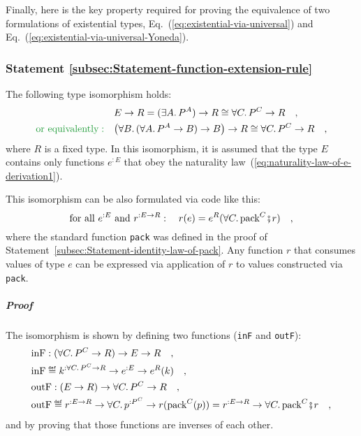 Finally, here is the key property required for proving the equivalence
of two formulations of existential types, Eq.~(\ref{eq:existential-via-universal})
and Eq.~(\ref{eq:existential-via-universal-Yoneda}).

\subsubsection{Statement \label{subsec:Statement-function-extension-rule}\ref{subsec:Statement-function-extension-rule}}

The following type isomorphism holds:
\begin{align*}
 & E\rightarrow R=(\exists A.\,P^{A})\rightarrow R\cong\forall C.\,P^{C}\rightarrow R\quad,\\
{\color{greenunder}\text{or equivalently}:}\quad & \big(\forall B.\,(\forall A.\,P^{A}\rightarrow B)\rightarrow B\big)\rightarrow R\cong\forall C.\,P^{C}\rightarrow R\quad,
\end{align*}
where $R$ is a fixed type. In this isomorphism, it is assumed that
the type $E$ contains only functions $e^{:E}$ that obey the naturality
law~(\ref{eq:naturality-law-of-e-derivation1}). 

This isomorphism can be also formulated via code like this:
\begin{equation}
\text{for all }e^{:E}\text{ and }r^{:E\rightarrow R}:\quad r(e)=e^{R}(\forall C.\,\text{pack}^{C}\bef r)\quad,\label{eq:surjectivity-of-pack}
\end{equation}
where the standard function \lstinline!pack! was defined in the proof
of Statement~\ref{subsec:Statement-identity-law-of-pack}. Any function
$r$ that consumes values of type $e$ can be expressed via application
of $r$ to values constructed via \lstinline!pack!.

\subparagraph{Proof}

The isomorphism is shown by defining two functions (\lstinline!inF!
and \lstinline!outF!):
\begin{align*}
 & \text{inF}:(\forall C.\,P^{C}\rightarrow R)\rightarrow E\rightarrow R\quad,\\
 & \text{inF}\triangleq k^{:\forall C.\,P^{C}\rightarrow R}\rightarrow e^{:E}\rightarrow e^{R}(k)\quad,\\
 & \text{outF}:(E\rightarrow R)\rightarrow\forall C.\,P^{C}\rightarrow R\quad,\\
 & \text{outF}\triangleq r^{:E\rightarrow R}\rightarrow\forall C.\,p^{:P^{C}}\rightarrow r(\text{pack}^{C}(p))=r^{:E\rightarrow R}\rightarrow\forall C.\,\text{pack}^{C}\bef r\quad,
\end{align*}
and by proving that those functions are inverses of each other.

